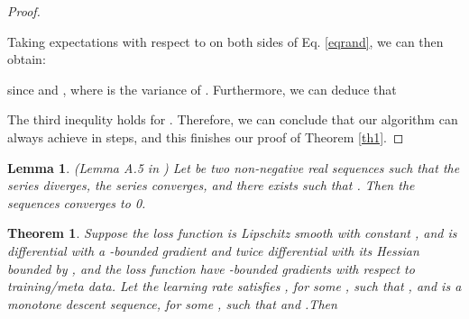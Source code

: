 \documentclass{article}
\newtheorem{theorem}{Theorem}
\newtheorem{lemma}{Lemma}
\begin{document}
\begin{proof}
\begin{tiny}
		\end{tiny}
Taking expectations with respect to  on both sides of Eq. \ref{eqrand}, we can then obtain:
		\begin{tiny}
			
		\end{tiny}
		since  and , where
		 is the variance of .
		Furthermore, we can deduce that
		
		The third inequlity holds for .
		Therefore, we can conclude that our algorithm can always achieve  in  steps, and this finishes our proof of Theorem \ref{th1}.
	\end{proof}
	
	\begin{lemma}\label{lemma2}
		(Lemma A.5 in \cite{mairal2013stochastic}) Let  be two non-negative real sequences such that the series  diverges, the series  converges, and there exists  such that . Then the sequences  converges to 0.\\
	\end{lemma}
	\begin{theorem}\label{th2}
		Suppose the loss function  is Lipschitz smooth with constant , and  is differential with a -bounded gradient and twice differential with its Hessian bounded by , and the loss function  have -bounded gradients with respect to training/meta data. Let the learning rate  satisfies , for some , such that , and  is a monotone descent sequence,  for some , such that  and .Then
		
	\end{theorem}
	
	
	
\end{document}
